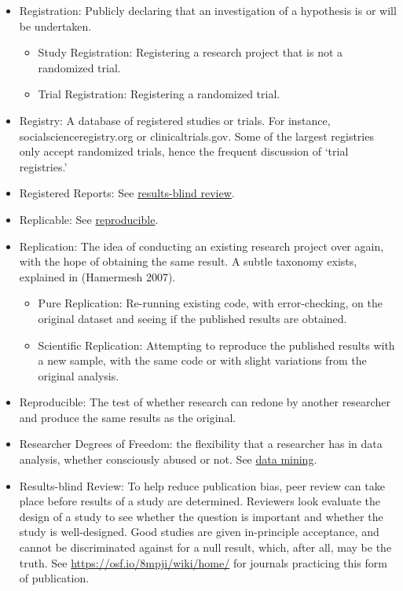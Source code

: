 \documentclass[12pt] {article}
\begin{document}
\begin{itemize}
\item
Registration: Publicly declaring that an investigation of a hypothesis is or will be undertaken.
\begin{itemize}
\item  Study Registration: Registering a research project that is not a randomized trial.
\item  Trial Registration: Registering a randomized trial. 
\end{itemize}
\item
Registry: A database of registered studies or trials. For instance, socialscienceregistry.org or clinicaltrials.gov. Some of the largest registries only accept randomized trials, hence the frequent discussion of ‘trial registries.’

\item
Registered Reports: See \hyperref[def-dbp]{results-blind review}.

\item
Replicable: See \hyperref[def-repro]{reproducible}.

\item
Replication: The idea of conducting an existing research project over again, with the hope of obtaining the same result. A subtle taxonomy exists, explained in (Hamermesh 2007).
\begin{itemize}
\item
Pure Replication: Re-running existing code, with error-checking, on the original dataset and seeing if the published results are obtained.
\item
Scientific Replication: Attempting to reproduce the published results with a new sample, with the same code or with slight variations from the original analysis.
\end{itemize}

\item \label{def-repro}
Reproducible: The test of whether research can redone by another researcher and produce the same results as the original. 
\item
Researcher Degrees of Freedom: the flexibility that a researcher has in data analysis, whether consciously abused or not. See \hyperref[def-mining]{data mining}. 
\item \label{def-rbr}
Results-blind Review: To help reduce publication bias, peer review can take place before results of a study are determined. Reviewers look evaluate the design of a study to see whether the question is important and whether the study is well-designed. Good studies are given in-principle acceptance, and cannot be discriminated against for a null result, which, after all, may be the truth. See \url{https://osf.io/8mpji/wiki/home/} for journals practicing this form of publication.


\end{itemize}
\end{document}

